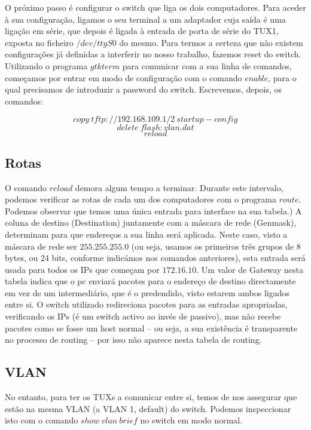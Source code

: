 \documentclass[a4paper,11pt,titlepage]{article}
\begin{document}
O próximo passo é configurar o switch que liga os dois computadores.  Para
aceder à sua configuração, ligamos o seu terminal a um adaptador cuja saída é
uma ligação em série, que depois é ligada à entrada de porta de série do TUX1,
exposta no ficheiro $/dev/ttyS0$ do mesmo.
Para termos a certeza que não existem configurações já definidas a interferir no nosso trabalho, fazemos reset do switch. Utilizando o programa $gtkterm$ para
comunicar com a sua linha de comandos, começamos por entrar em modo de
configuração com o comando $enable$, para o qual precisamos de introduzir a
password do switch. Escrevemos, depois, os comandos:

$$copy\ tftp://192.168.109.1/2\ startup-config$$
$$delete\ flash:vlan.dat$$
$$reload$$

\subsection*{Rotas}

O comando $reload$ demora algum tempo a terminar. Durante este intervalo,
podemos verificar as rotas de cada um dos computadores com o programa
$route$.
Podemos observar que temos uma única entrada para interface na sua tabela.)
A coluna de destino (Destination) juntamente com a máscara de rede (Genmask),
determinam para que endereços a sua linha será aplicada. Neste caso, visto a
máscara de rede ser $255.255.255.0$ (ou seja, usamos os primeiros três grupos
de 8 bytes, ou 24 bits, conforme indicámos nos comandos anteriores), esta
entrada será usada para todos os IPs que começam por $172.16.10$.
Um valor de Gateway nesta tabela indica que o pc enviará pacotes para o endereço de destino directamente em vez de um intermediário, que é o predendido, visto
estarem ambos ligados entre si. O switch utilizado redireciona pacotes para as
entradas apropriadas, verificando os IPs (é um switch activo ao invés de
passivo), mas não recebe pacotes como se fosse um host normal -- ou seja, a sua
existência é transparente no processo de routing -- por isso não aparece nesta
tabela de routing.

\subsection*{VLAN}

No entanto, para ter os TUXs a comunicar entre si, temos de nos assegurar que
estão na mesma VLAN (a VLAN 1, default) do switch. Podemos inspeccionar isto
com o comando $show\ vlan\ brief$ no switch em modo normal.
\end{document}
